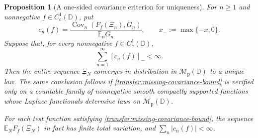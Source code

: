 \documentclass[11pt,a4paper]{article}
\numberwithin{equation}{section}
\newtheorem{proposition}[theorem]{Proposition}
\theoremstyle{definition}
\theoremstyle{remark}
\newcommand{\D}{\mathbb D}
\newcommand{\E}{\mathbb E}
\newcommand{\Mp}{\mathcal M_{\mathrm p}}
\newcommand{\Cov}{\operatorname{Cov}}
\begin{document}
\begin{proposition}[A one-sided covariance criterion for uniqueness]
\label{prop:transfer-uniqueness-criterion}
For $n\ge1$ and nonnegative $f\in C_c^1(\D)$, put
\[
 c_n(f)=
 \frac{\Cov_n(F_f(\Xi_n),G_n)}{\E_nG_n},
 \qquad x_-:=\max\{-x,0\}.
\]
Suppose that, for every nonnegative $f\in C_c^1(\D)$,
\begin{equation}\label{transfer:missing-covariance-bound}
 \sum_{n=1}^{\infty} [c_n(f)]_-<\infty.
\end{equation}
Then the entire sequence $\Xi_N$ converges in distribution in
$\Mp(\D)$ to a unique law. The same conclusion follows if
\eqref{transfer:missing-covariance-bound} is verified only on a
countable family of nonnegative smooth compactly supported functions
whose Laplace functionals determine laws on $\Mp(\D)$.

For each test function satisfying
\eqref{transfer:missing-covariance-bound}, the sequence
$\E_NF_f(\Xi_N)$ in fact has finite total variation, and
$\sum_n|c_n(f)|<\infty$.
\end{proposition}
\end{document}

